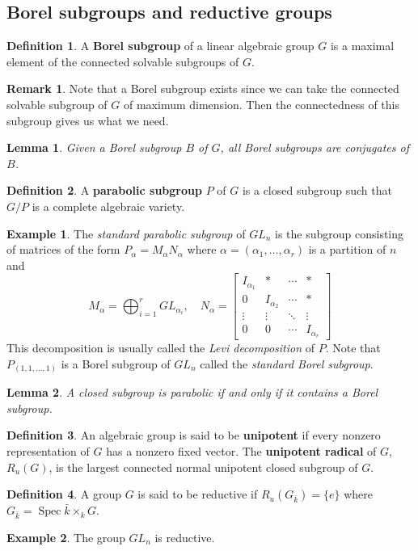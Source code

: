 \documentclass[12pt]{article}
\newtheorem{lemma}{Lemma}[section]
\theoremstyle{remark}
\theoremstyle{definition}
\newtheorem{remark}{Remark}[section]
\newtheorem{example}{Example}[section]
\newtheorem{definition}{Definition}[section]
\newcommand{\Spec}[0]{\operatorname{Spec}}
\begin{document}
    \subsection{Borel subgroups and reductive groups}
    \begin{definition}
        A \textbf{Borel subgroup} of a linear algebraic group $G$ is a maximal element of the connected solvable subgroups of $G$.
    \end{definition}
    \begin{remark}
        Note that a Borel subgroup exists since we can take the connected solvable subgroup of $G$ of maximum dimension. Then the connectedness of this subgroup gives us what we need.
    \end{remark}
    \begin{lemma}
        Given a Borel subgroup $B$ of $G$, all Borel subgroups are conjugates of $B$.
    \end{lemma}
    \begin{definition}
        A \textbf{parabolic subgroup} $P$ of $G$ is a closed subgroup such that $G/P$ is a complete algebraic variety.
    \end{definition}
    \begin{example}
        The \textit{standard parabolic subgroup} of $GL_n$ is the subgroup consisting of matrices of the form $P_\alpha=M_\alpha N_\alpha$ where $\alpha=(\alpha_1,\dots,\alpha_r)$ is a partition of $n$ and
        \[M_\alpha=\bigoplus_{i=1}^r GL_{\alpha_i},\quad N_\alpha=\begin{bmatrix}
            I_{\alpha_1} & * & \cdots & *\\
            0 & I_{\alpha_2} & \cdots & *\\
            \vdots & \vdots & \ddots & \vdots\\
            0 & 0 & \cdots & I_{\alpha_r}
        \end{bmatrix}\]
        This decomposition is usually called the \textit{Levi decomposition} of $P$. Note that $P_{(1,1,\dots,1)}$ is a Borel subgroup of $GL_n$ called the \textit{standard Borel subgroup}.
    \end{example}
    \begin{lemma}
        A closed subgroup is parabolic if and only if it contains a Borel subgroup.
    \end{lemma}
    \begin{definition}
        An algebraic group is said to be \textbf{unipotent} if every nonzero representation of $G$ has a nonzero fixed vector. The \textbf{unipotent radical} of $G$, $R_u(G)$, is the largest connected normal unipotent closed subgroup of $G$.
    \end{definition}
    \begin{definition}
        A group $G$ is said to be reductive if $R_u(G_{\bar k})=\{e\}$ where $G_{\bar k}=\Spec \bar k\times_k G$.
    \end{definition}
    \begin{example}
        The group $GL_n$ is reductive.
    \end{example}
\end{document}
